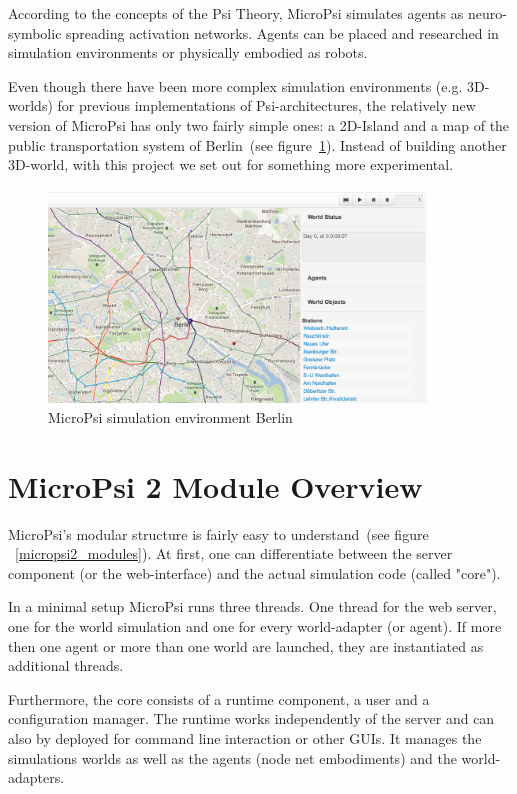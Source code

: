 According to the concepts of the Psi Theory, MicroPsi simulates agents as neuro-symbolic spreading activation networks. Agents can be placed and researched in simulation environments or physically embodied as robots.~\cite{conf/agi/Bach12}
        
Even though there have been more complex simulation environments (e.g. 3D-worlds) for previous implementations of Psi-architectures, the relatively new version of MicroPsi has only two fairly simple ones: a 2D-Island and a map of the public transportation system of Berlin~(see figure~\ref{mp2_berlin}). Instead of building another 3D-world, with this project we set out for something more experimental.

\begin{figure}[h]
  \centering
    \includegraphics[width=10cm]{graphics/mp2_berlin}
  \caption{MicroPsi simulation environment Berlin}
  \label{mp2_berlin}
\end{figure}

        \section{MicroPsi 2 Module Overview}
MicroPsi's modular structure is fairly easy to understand~(see figure ~\ref{micropsi2_modules}). At first, one can differentiate between the server component (or the web-interface) and the actual simulation code (called "core").

In a minimal setup MicroPsi runs three threads. One thread for the web server, one for the world simulation and one for every world-adapter (or agent). If more then one agent or more than one world are launched, they are instantiated as additional threads.

Furthermore, the core consists of a runtime component, a user and a configuration manager. The runtime works independently of the server and can also by deployed for command line interaction or other GUIs. It manages the simulations worlds as well as the agents (node net embodiments) and the world-adapters.~\cite{conf/agi/Bach12}
\\          
          
